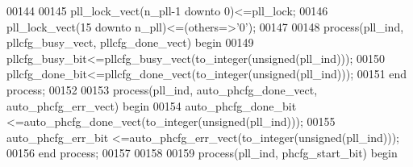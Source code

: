 \begin{DoxyCode}
00144 
00145 \textcolor{vhdlchar}{pll_lock_vect}\textcolor{vhdlchar}{(}\textcolor{vhdlchar}{n_pll}\textcolor{vhdlchar}{-}\textcolor{vhdllogic}{}\textcolor{vhdllogic}{1} \textcolor{keywordflow}{downto} \textcolor{vhdllogic}{}\textcolor{vhdllogic}{0}\textcolor{vhdlchar}{)}\textcolor{vhdlchar}{<=}\textcolor{vhdlchar}{pll_lock};
00146 \textcolor{vhdlchar}{pll_lock_vect}\textcolor{vhdlchar}{(}\textcolor{vhdllogic}{}\textcolor{vhdllogic}{15} \textcolor{keywordflow}{downto} \textcolor{vhdlchar}{n_pll}\textcolor{vhdlchar}{)}\textcolor{vhdlchar}{<=}\textcolor{vhdlchar}{(}\textcolor{keywordflow}{others}\textcolor{vhdlchar}{=}\textcolor{vhdlchar}{>}\textcolor{vhdlchar}{'}\textcolor{vhdllogic}{}\textcolor{vhdllogic}{0}\textcolor{vhdlchar}{'}\textcolor{vhdlchar}{)};
00147 
00148 \textcolor{keywordflow}{process}(pll_ind, pllcfg_busy_vect, pllcfg_done_vect) \textcolor{keywordflow}{begin}
00149     \textcolor{vhdlchar}{pllcfg_busy_bit}\textcolor{vhdlchar}{<=}\textcolor{vhdlchar}{pllcfg_busy_vect}\textcolor{vhdlchar}{(}\textcolor{vhdlchar}{to\_integer}\textcolor{vhdlchar}{(}\textcolor{comment}{unsigned}\textcolor{vhdlchar}{(}\textcolor{vhdlchar}{pll_ind}\textcolor{vhdlchar}{)}\textcolor{vhdlchar}{)}\textcolor{vhdlchar}{)};
00150     \textcolor{vhdlchar}{pllcfg_done_bit}\textcolor{vhdlchar}{<=}\textcolor{vhdlchar}{pllcfg_done_vect}\textcolor{vhdlchar}{(}\textcolor{vhdlchar}{to\_integer}\textcolor{vhdlchar}{(}\textcolor{comment}{unsigned}\textcolor{vhdlchar}{(}\textcolor{vhdlchar}{pll_ind}\textcolor{vhdlchar}{)}\textcolor{vhdlchar}{)}\textcolor{vhdlchar}{)};
00151 \textcolor{keywordflow}{end} \textcolor{keywordflow}{process};
00152 
00153 \textcolor{keywordflow}{process}(pll_ind, auto_phcfg_done_vect, auto_phcfg_err_vect) \textcolor{keywordflow}{begin}
00154     \textcolor{vhdlchar}{auto_phcfg_done_bit}  \textcolor{vhdlchar}{<=}\textcolor{vhdlchar}{auto_phcfg_done_vect}\textcolor{vhdlchar}{(}\textcolor{vhdlchar}{to\_integer}\textcolor{vhdlchar}{(}\textcolor{comment}{unsigned}\textcolor{vhdlchar}{(}\textcolor{vhdlchar}{pll_ind}\textcolor{vhdlchar}{)}\textcolor{vhdlchar}{)}\textcolor{vhdlchar}{)};
00155     \textcolor{vhdlchar}{auto_phcfg_err_bit}   \textcolor{vhdlchar}{<=}\textcolor{vhdlchar}{auto_phcfg_err_vect}\textcolor{vhdlchar}{(}\textcolor{vhdlchar}{to\_integer}\textcolor{vhdlchar}{(}\textcolor{comment}{unsigned}\textcolor{vhdlchar}{(}\textcolor{vhdlchar}{pll_ind}\textcolor{vhdlchar}{)}\textcolor{vhdlchar}{)}\textcolor{vhdlchar}{)};
00156 \textcolor{keywordflow}{end} \textcolor{keywordflow}{process};
00157 
00158 
00159 \textcolor{keywordflow}{process}(pll_ind, phcfg_start_bit) \textcolor{keywordflow}{begin}

\end{DoxyCode}
